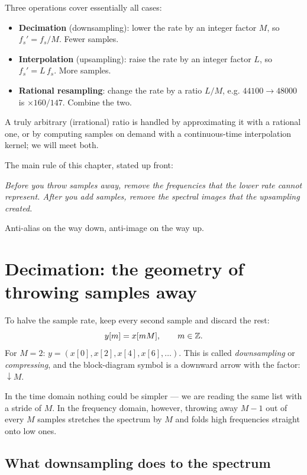 Three operations cover essentially all cases:
\begin{itemize}
  \item \textbf{Decimation} (downsampling): lower the rate by an integer factor
  $M$, so $f_s' = f_s/M$. Fewer samples.
  \item \textbf{Interpolation} (upsampling): raise the rate by an integer
  factor $L$, so $f_s' = L\,f_s$. More samples.
  \item \textbf{Rational resampling}: change the rate by a ratio $L/M$, e.g.
  $44100 \to 48000$ is $\times 160/147$. Combine the two.
\end{itemize}
A truly arbitrary (irrational) ratio is handled by approximating it with a
rational one, or by computing samples on demand with a continuous-time
interpolation kernel; we will meet both.

\begin{focusbox}
The main rule of this chapter, stated up front:
\begin{center}
\emph{Before you throw samples away, remove the frequencies that the lower rate
cannot represent. After you add samples, remove the spectral images that the
upsampling created.}
\end{center}
Anti-alias on the way down, anti-image on the way up.
\end{focusbox}

\section{Decimation: the geometry of throwing samples away}
\label{ch22:decim}

To halve the sample rate, keep every second sample and discard the rest:
\begin{equation}
  y[m] = x[m M], \qquad m \in \mathbb{Z}.
  \label{ch22:downdef}
\end{equation}
For $M=2$: $y = (x[0], x[2], x[4], x[6], \dots)$. This is called
\emph{downsampling} or \emph{compressing}, and the block-diagram symbol is a
downward arrow with the factor: $\downarrow M$.

In the time domain nothing could be simpler --- we are reading the same list with a
stride of $M$. In the frequency domain, however, throwing away $M-1$ out of every
$M$ samples stretches the spectrum by $M$ and folds high frequencies straight onto low ones.

\subsection{What downsampling does to the spectrum}

